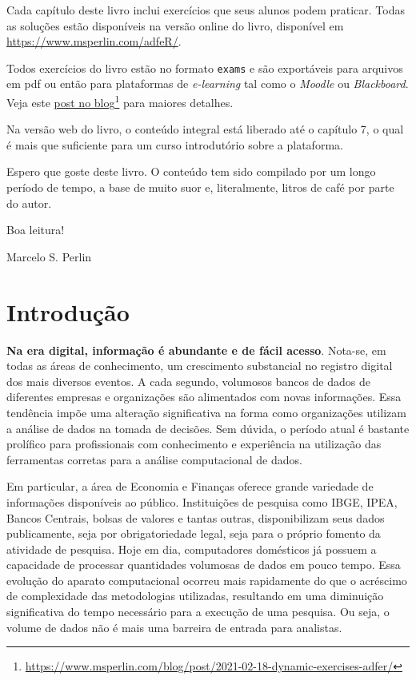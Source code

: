 \documentclass[
  11pt,
]{book}
\providecommand{\tightlist}{%
  \setlength{\itemsep}{0pt}\setlength{\parskip}{0pt}}
\begin{document}
\begin{description}
\tightlist
\item[Exercícios estáticos na internet]
Cada capítulo deste livro inclui exercícios que seus alunos podem praticar. Todas as soluções estão disponíveis na versão online do livro, disponível em \url{https://www.msperlin.com/adfeR/}.
\item[Exercícios exportáveis para pdf ou plataformas de \emph{e-learning}]
Todos exercícios do livro estão no formato \texttt{exams} \citep{R-exams} e são exportáveis para arquivos em pdf ou então para plataformas de \emph{e-learning} tal como o \emph{Moodle} ou \emph{Blackboard}. Veja este \href{https://www.msperlin.com/blog/post/2021-02-18-dynamic-exercises-adfer/}{post no blog}\footnote{\url{https://www.msperlin.com/blog/post/2021-02-18-dynamic-exercises-adfer/}} para maiores detalhes.
\item[Acesso ao livro na internet]
Na versão web do livro, o conteúdo integral está liberado até o capítulo 7, o qual é mais que suficiente para um curso introdutório sobre a plataforma.
\end{description}

Espero que goste deste livro. O conteúdo tem sido compilado por um longo período de tempo, a base de muito suor e, literalmente, litros de café por parte do autor.

Boa leitura!

Marcelo S. Perlin

\hypertarget{introducao}{%
\chapter{Introdução}\label{introducao}}

\textbf{Na era digital, informação é abundante e de fácil acesso}. Nota-se, em todas as áreas de conhecimento, um crescimento substancial no registro digital dos mais diversos eventos. A cada segundo, volumosos bancos de dados de diferentes empresas e organizações são alimentados com novas informações. Essa tendência impõe uma alteração significativa na forma como organizações utilizam a análise de dados na tomada de decisões. Sem dúvida, o período atual é bastante prolífico para profissionais com conhecimento e experiência na utilização das ferramentas corretas para a análise computacional de dados.

Em particular, a área de Economia e Finanças oferece grande variedade de informações disponíveis ao público. Instituições de pesquisa como IBGE, IPEA, Bancos Centrais, bolsas de valores e tantas outras, disponibilizam seus dados publicamente, seja por obrigatoriedade legal, seja para o próprio fomento da atividade de pesquisa. Hoje em dia, computadores domésticos já possuem a capacidade de processar quantidades volumosas de dados em pouco tempo. Essa evolução do aparato computacional ocorreu mais rapidamente do que o acréscimo de complexidade das metodologias utilizadas, resultando em uma diminuição significativa do tempo necessário para a execução de uma pesquisa. Ou seja, o volume de dados não é mais uma barreira de entrada para analistas.
\end{document}
